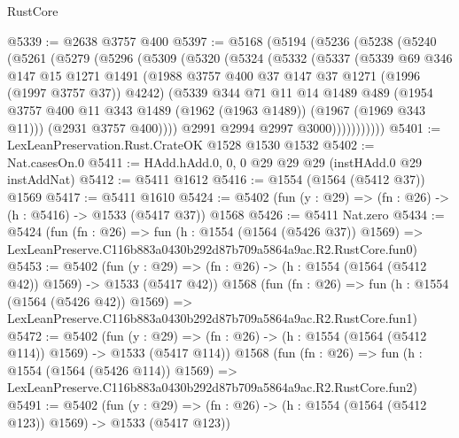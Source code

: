 \begin{lexlean}{RustCore}
\begin{coremodule}
@5339 := @2638 @3757 @400
@5397 := @5168
    (@5194
      (@5236
        (@5238
          (@5240
            (@5261
              (@5279
                (@5296
                  (@5309
                    (@5320
                      (@5324
                        (@5332
                          (@5337
                            (@5339
                              @69
                              @346
                              @147
                              @15
                              @1271
                              @1491
                              (@1988 @3757 @400 @37 @147 @37 @1271 (@1996 (@1997 @3757 @37)) @4242)
                              (@5339
                                @344
                                @71
                                @11
                                @14
                                @1489
                                @489
                                (@1954
                                  @3757
                                  @400
                                  @11
                                  @343
                                  @1489
                                  (@1962 (@1963 @1489))
                                  (@1967 (@1969 @343 @11)))
                                (@2931 @3757 @400))))
                          @2991
                          @2994
                          @2997
                          @3000)))))))))))
@5401 := LexLeanPreservation.Rust.CrateOK @1528 @1530 @1532
@5402 := Nat.casesOn.{0}
@5411 := HAdd.hAdd.{0, 0, 0} @29 @29 @29 (instHAdd.{0} @29 instAddNat)
@5412 := @5411 @1612
@5416 := @1554 (@1564 (@5412 @37)) @1569
@5417 := @5411 @1610
@5424 := @5402 (fun (y : @29) => (fn : @26) -> (h : @5416) -> @1533 (@5417 @37)) @1568
@5426 := @5411 Nat.zero
@5434 := @5424
    (fun (fn : @26) =>
    fun (h : @1554 (@1564 (@5426 @37)) @1569) =>
    LexLeanPreserve.C116b883a0430b292d87b709a5864a9ac.R2.RustCore.fun0)
@5453 := @5402
    (fun (y : @29) => (fn : @26) -> (h : @1554 (@1564 (@5412 @42)) @1569) -> @1533 (@5417 @42))
    @1568
    (fun (fn : @26) =>
    fun (h : @1554 (@1564 (@5426 @42)) @1569) =>
    LexLeanPreserve.C116b883a0430b292d87b709a5864a9ac.R2.RustCore.fun1)
@5472 := @5402
    (fun (y : @29) => (fn : @26) -> (h : @1554 (@1564 (@5412 @114)) @1569) -> @1533 (@5417 @114))
    @1568
    (fun (fn : @26) =>
    fun (h : @1554 (@1564 (@5426 @114)) @1569) =>
    LexLeanPreserve.C116b883a0430b292d87b709a5864a9ac.R2.RustCore.fun2)
@5491 := @5402
    (fun (y : @29) => (fn : @26) -> (h : @1554 (@1564 (@5412 @123)) @1569) -> @1533 (@5417 @123))

\end{coremodule}
\end{lexlean}
